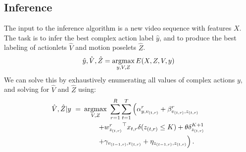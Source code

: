 \subsection{Inference}
\label{subsec:inference}
The input to the inference algorithm is a new video sequence with features
$X$. The task is to infer the best complex action label $\hat y$, and to 
produce the best labeling of actionlets $\hat V$ and motion poselets $\hat Z$.
{\small
\begin{equation}
  \hat y, \hat V, \hat Z = \operatorname*{argmax}_{y, V, Z} E(X, Z, V, y)
\end{equation}}
We can solve this by exhaustively enumerating all values of complex actions $y$, and solving for $\hat{V}$ and $\hat{Z}$ using:
{\small
\begin{equation}
\begin{split}
 \hat{V}, \hat{Z} | y ~ =~ &   \argmax_{V,Z} ~   \sum_{r=1}^R \sum_{t=1}^T \left( \alpha^r_{y,v_{(t,r)}} 
                  + \beta^r_{v_{(t,r)},z_{(t,r)}}\right. \\
				&\quad\quad \left.+ {w^r_{z_{(t,r)}}}^\top x_{t,r} \delta(z_{(t,r)} \le K)  + \theta \delta_{z_{(t,r)}}^{K+1} \right. \\ 
				& \quad\quad \left.+ \gamma_{v_{({t-1},r)},v_{(t,r)}} + \eta_{z_{({t-1},r)},z_{(t,r)}}  \vphantom{{w^r_{z_{(t,r)}}}^\top x_{t,r}} \right). \\
\end{split}
\label{eq:classify_inference}
\end{equation}
}
